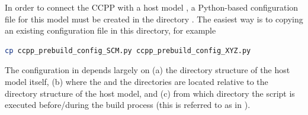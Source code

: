 In order to connect the CCPP with a host model , a Python-based configuration file for this model must be created in the directory . The easiest way is to copying an existing configuration file in this directory, for example
\begin{lstlisting}[language=bash]
cp ccpp_prebuild_config_SCM.py ccpp_prebuild_config_XYZ.py
\end{lstlisting}
The configuration in  depends largely on (a) the directory structure of the host model itself, (b) where the  and the  directories are located relative to the directory structure of the host model, and (c) from which directory the  script is executed before/during the build process (this is referred to as  in ).

